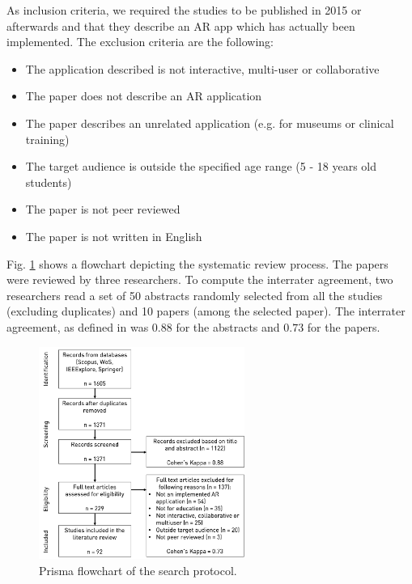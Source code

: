 As inclusion criteria, we required the studies to be published in 2015 or afterwards and that they describe an AR app which has actually been implemented. The exclusion criteria are the following:

\begin{itemize}
    \item The application described is not interactive, multi-user or collaborative
    \item The paper does not describe an AR application
    \item The paper describes an unrelated application (e.g. for museums or clinical training)
    \item The target audience is outside the specified age range (5 - 18 years old students)
    \item The paper is not peer reviewed
    \item The paper is not written in English
\end{itemize}

Fig. \ref{fig:flowchart} shows a flowchart depicting the systematic review process. The \papersToRead papers were reviewed by three researchers. To compute the interrater agreement, two researchers read a set of 50 abstracts randomly selected from all the studies (excluding duplicates) and 10 papers (among the \papersSelected selected paper). The interrater agreement, as defined in \citep{cohen1960coefficient} was $0.88$ for the abstracts and $0.73$ for the papers.

\begin{figure}[ht]	
	\begin{center}
	\includegraphics[width=0.6\textwidth]{figures/prisma.png}
	\caption{Prisma flowchart of the search protocol.}
	\label{fig:flowchart}
    \end{center}
\end{figure}


